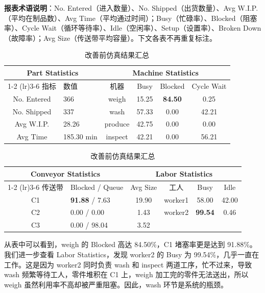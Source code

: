 \documentclass[12pt, a4paper, UTF8]{ctexart}
\begin{document}
\smallskip
\noindent\textbf{报表术语说明}：No. Entered（进入数量）、No. Shipped（出货数量）、Avg W.I.P.（平均在制品数）、Avg Time（平均通过时间）；Busy（忙碌率）、Blocked（阻塞率）、Cycle Wait（循环等待率）、Idle（空闲率）、Setup（设置率）、Broken Down（故障率）；Avg Size（传送带平均容量）。下文各表不再重复标注。

\begin{table}[H]
    \centering
    \caption{改善前仿真结果汇总}
    \label{tab:before_all}
    \small
    \begin{tabular}{clcccc}
        \toprule
        \multicolumn{2}{c}{\textbf{Part Statistics}} & \multicolumn{4}{c}{\textbf{Machine Statistics}} \\
        \cmidrule(lr){1-2} \cmidrule(lr){3-6}
        指标 & 数值 & 机器 & Busy & Blocked & Cycle Wait \\
        \midrule
        No. Entered & 366 & weigh & 15.25 & \textbf{84.50} & 0.25 \\
        No. Shipped & 337 & wash & 57.33 & 0.00 & 42.21 \\
        Avg W.I.P. & 28.26 & produce & 42.75 & 0.00 & 0.00 \\
        Avg Time & 185.30 min & inspect & 42.21 & 0.00 & 56.21 \\
        \bottomrule
    \end{tabular}

    \vspace{6pt}
    \small
    \begin{tabular}{clcccc}
        \toprule
        \multicolumn{2}{c}{\textbf{Conveyor Statistics}} & \multicolumn{4}{c}{\textbf{Labor Statistics}} \\
        \cmidrule(lr){1-2} \cmidrule(lr){3-6}
        传送带 & Blocked / Queue & Avg Size & 工人 & Busy & Idle \\
        \midrule
        C1 & \textbf{91.88} / 7.63 & 19.90 & worker1 & 58.00 & 42.00 \\
        C2 & 0.00 / 0.00 & 1.43 & worker2 & \textbf{99.54} & 0.46 \\
        C3 & 0.00 / 98.04 & 3.52 & & & \\
        \bottomrule
    \end{tabular}
\end{table}

从表中可以看到，weigh 的 Blocked 高达 84.50\%，C1 堵塞率更是达到 91.88\%。我们进一步查看 Labor Statistics，发现 worker2 的 Busy 为 99.54\%，几乎一直在工作。这是因为 worker2 同时负责 wash 和 inspect 两道工序，忙不过来，导致 wash 频繁等待工人，零件堆积在 C1 上，weigh 加工完的零件无法送出，所以 weigh 虽然利用率不高却被严重阻塞。因此，wash 环节是系统的瓶颈。
\end{document}

